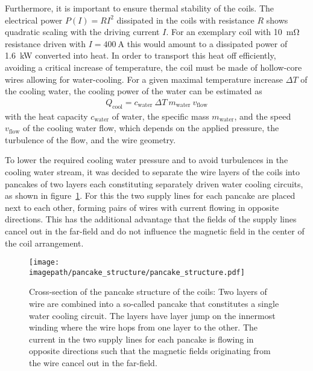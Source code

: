 Furthermore, it is important to ensure thermal stability of the coils. The electrical power $P(I) = RI^2$ dissipated in the coils with resistance $R$ shows quadratic scaling  with the driving current $I$. For an exemplary coil with \SI{10}{\milli\ohm} resistance driven with $I = \SI{400}{\ampere}$ this would amount to a dissipated power of \SI{1.6}{\kilo\watt} converted into heat. In order to transport this heat off efficiently, avoiding a critical increase of temperature, the coil must be made of hollow-core wires allowing for water-cooling. For a given maximal temperature increase $\Delta T$ of the cooling water, the cooling power of the water can be estimated as
\begin{align}
    Q_\text{cool} = c_\text{water} ~ \Delta T ~ m_\text{water} ~ v_\text{flow}
\end{align}
with the heat capacity $ c_\text{water}$ of water, the specific mass $m_\text{water}$, and the speed $v_\text{flow}$ of the cooling water flow, which depends on the applied pressure, the turbulence of the flow, and the wire geometry.

To lower the required cooling water pressure and to avoid turbulences in the cooling water stream, it was decided to separate the wire layers of the coils into pancakes of two layers each constituting separately driven water cooling circuits, as shown in figure~\ref{fig:pancake_structure}. For this the two supply lines for each pancake are placed next to each other, forming pairs of wires with current flowing in opposite directions. This has the additional advantage that the fields of the supply lines cancel out in the far-field and do not influence the magnetic field in the center of the coil arrangement.

\begin{figure}
    \centering
    \texttt{[image: \\imagepath/pancake\_structure/pancake\_structure.pdf]}
    \caption{Cross-section of the pancake structure of the coils: Two layers of wire are combined into a so-called pancake that constitutes a single water cooling circuit. The layers have layer jump on the innermost winding where the wire hops from one layer to the other. The current in the two supply lines for each pancake is flowing in opposite directions such that the magnetic fields originating from the wire cancel out in the far-field.}
    \label{fig:pancake_structure}
\end{figure}

